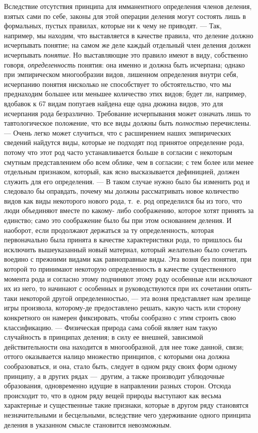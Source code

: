 \documentclass[twoside]{article}
\begin{document}
Вследствие отсутствия принципа для имманентного определения
членов деления, взятых сами по себе, законы для этой операции деления могут
состоять лишь в формальных, пустых правилах, которые ни к чему не
приводят. — Так, например, мы находим, что выставляется в
качестве правила, что деление должно исчерпывать понятие; на самом же деле
каждый отдельный член деления должен исчерпывать
{\em понятие}. Но
выставляющие это правило имеют в виду, собственно говоря,
{\em определенность}
понятия: она именно и должна быть исчерпана; однако при
эмпирическом многообразии видов, лишенном определения внутри
себя, исчерпанию понятия нисколько не способствует то обстоятельство, что
мы преднаходим большее или меньшее количество этих видов; будет ли,
например, вдобавок к 67 видам попугаев найдена еще одна дюжина видов, это
для исчерпания рода безразлично. Требование исчерпывания может означать
лишь то тавтологическое положение, что все виды должны быть
{\em полностью}
перечислены. — Очень легко может случиться,
что с расширением наших эмпирических сведений найдутся виды, которые не
подходят под принятое определение рода, потому что этот род часто
устанавливается больше в согласии с некоторым смутным представлением обо
всем облике, чем в согласии; с тем более или менее отдельным признаком,
который, как ясно высказывается дефиницией, должен служить для его
определения. — В таком случае нужно было бы изменить род и
следовало бы оправдать, почему мы должны рассматривать новое количество
видов как виды некоторого нового рода, т.~е. род определился бы из того,
что люди объединяют вместе по какому- либо соображению, которое хотят
принять за единство; само это соображение было бы при этом основанием
деления. И наоборот, если продолжают держаться за ту определенность,
которая первоначально была принята в качестве характеристики рода, то
пришлось бы исключить вышеуказанный новый материал, который желательно было
сочетать воедино с прежними видами как равноправные виды. Эта возня без
понятия, при которой то принимают некоторую определенность в качестве
существенного момента рода и согласно этому подчиняют этому роду особенные
или исключают их из него, то начинают с особенных и руководствуются при их
сочетании опять-таки некоторой другой определенностью, — эта
возня представляет нам зрелище игры произвола, которому-де предоставлено
решать, какую часть или сторону конкретного он намерен фиксировать, чтобы
сообразно с этим строить свою классификацию. — Физическая
природа сама собой являет нам такую случайность в принципах деления; в силу
ее внешней, зависимой действительности она находится в многообразной, для
нее тоже данной, связи; оттого оказывается налицо множество принципов, с
которыми она должна сообразоваться, и она, стало быть, следует в одном ряду
своих форм одному принципу, а в других рядах —~другим, а
также производит ублюдочные образования, одновременно идущие в направлении
разных сторон. Отсюда происходит то, что в одном ряду вещей природы
выступают как весьма характерные и существенные такие признаки, которые в
другом ряду становятся незначительными и бесцельными, вследствие
чего удерживание одного принципа деления в указанном смысле
становится невозможным.
\end{document}
